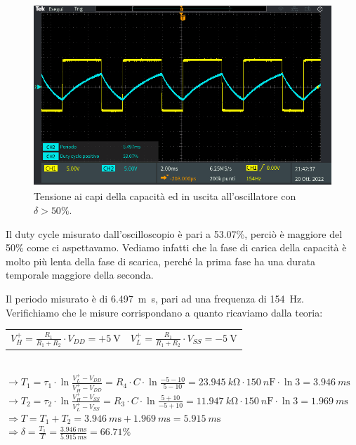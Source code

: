 \documentclass{report}
\begin{document}
\begin{figure}[h!]
	\centering
	\includegraphics[height=6.9cm]{immagini/TEK00033}
	\caption{Tensione ai capi della capacità ed in uscita all'oscillatore con $\delta>50\%$.}
	\label{figura:oscillo4_1}
\end{figure}
Il duty cycle misurato dall'oscilloscopio è pari a 53.07\%, perciò è maggiore del 50\% come ci aspettavamo. Vediamo infatti che la fase di carica della capacità è molto più lenta della fase di scarica, perché la prima fase ha una durata temporale maggiore della seconda. \par
Il periodo misurato è di \SI{6.497}{m\second}, pari ad una frequenza di \SI{154}{\hertz}. Verifichiamo che le misure corrispondano a quanto ricaviamo dalla teoria:
\begin{table}[h!]
	\begin{tabular}{cc}
		\;\;\;$\displaystyle{V_H^+=\frac{R_1}{R_1+R_2}\cdot V_{DD}=+\SI{5}{\volt}}$\;\;\;\;\;\;\;\;\;\;\;\;\;\;\;\;\;\;\;\;\;\;\; & $\displaystyle{V_L^+=\frac{R_1}{R_1+R_2}\cdot V_{SS}=-\SI{5}{\volt}}$\\ 
	\end{tabular}
\end{table}
\\\indent$\rightarrow\displaystyle{T_1=\tau_1\cdot\ln\frac{V_L^+-V_{DD}}{V_H^+-V_{DD}}=R_4\cdot C\cdot\ln\frac{-5-10}{5-10}=\SI{23.945}{k\ohm}\cdot\SI{150}{n\farad}\cdot\ln3}=\SI{3.946}{m\second}$
\\[6pt]\indent$\rightarrow\displaystyle{T_2=\tau_2\cdot\ln\frac{V_H^+-V_{SS}}{V_L^+-V_{SS}}=R_3\cdot C\cdot\ln\frac{5+10}{-5+10}=\SI{11.947}{k\ohm}\cdot\SI{150}{n\farad}\cdot\ln3}=\SI{1.969}{m\second}$
\\[6pt]\indent$\Rightarrow\displaystyle{T=T_1+T_2=\SI{3.946}{m\second}+\SI{1.969}{m\second}=\SI{5.915}{m\second}}$
\\[6pt]\indent$\Rightarrow\displaystyle{\delta=\frac{T_1}{T}=\frac{\SI{3.946}{m\second}}{\SI{5.915}{m\second}}= 66.71\%}$
\end{document}
